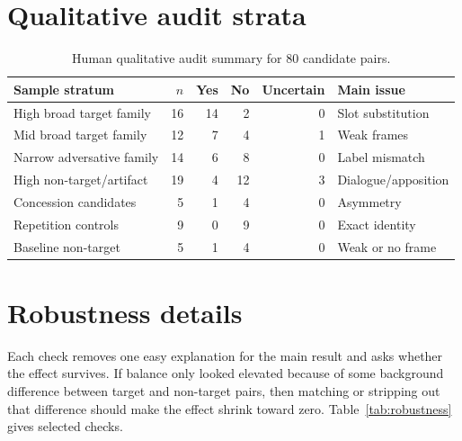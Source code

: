 \documentclass[12pt]{article}
\begin{document}
\clearpage
\section{Qualitative audit strata}
\label{app:audit-summary}

\begin{table}[H]
\centering
\scriptsize
\begin{tabular}{lrrrrl}
\toprule
Sample stratum & \(n\) & Yes & No & Uncertain & Main issue\\
\midrule
High broad target family & 16 & 14 & 2 & 0 & Slot substitution\\
Mid broad target family & 12 & 7 & 4 & 1 & Weak frames\\
Narrow adversative family & 14 & 6 & 8 & 0 & Label mismatch\\
High non-target/artifact & 19 & 4 & 12 & 3 & Dialogue/apposition\\
Concession candidates & 5 & 1 & 4 & 0 & Asymmetry\\
Repetition controls & 9 & 0 & 9 & 0 & Exact identity\\
Baseline non-target & 5 & 1 & 4 & 0 & Weak or no frame\\
\bottomrule
\end{tabular}
\caption{Human qualitative audit summary for 80 candidate pairs.}
\label{tab:audit-summary}
\end{table}

\clearpage
\section{Robustness details}
\label{app:robustness-details}

Each check removes one easy explanation for the main result and asks
whether the effect survives. If balance only looked elevated because of
some background difference between target and non-target pairs, then
matching or stripping out that difference should make the effect shrink
toward zero. Table~\ref{tab:robustness} gives selected checks.
\end{document}
